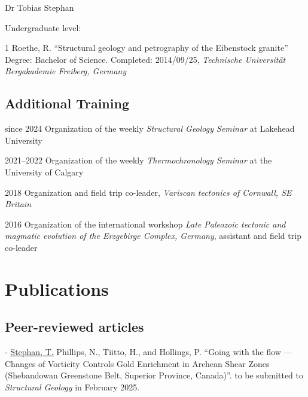 \documentclass[10pt, paper=letter]{scrartcl} %
\begin{document}
\begin{cv}{\textsf{Dr Tobias Stephan}}
\begin{cvlist}{Undergraduate level:}
        \item[1] Roethe, R. \enquote{Structural geology and petrography of the Eibenstock granite}\\
        Degree: Bachelor of Science. Completed: 2014/09/25, \textit{Technische Universität Bergakademie Freiberg, Germany}
    \end{cvlist}

    \subsection{Additional Training}
    \begin{cvlist}{}
        \item[since 2024] Organization of the weekly \textit{Structural Geology Seminar} at
        Lakehead University
        \item[2021--2022] Organization of the weekly \textit{Thermochronology Seminar} at the University of Calgary
        \item[2018] Organization and field trip co-leader, \textit{Variscan tectonics of Cornwall, SE Britain}
        \item[2016] Organization of the international workshop \textit{Late Paleozoic tectonic and magmatic evolution of the Erzgebirge Complex, Germany}, assistant and field trip co-leader
    \end{cvlist}

    \section{Publications}
    \subsection{Peer-reviewed articles}
    \setul{1pt}{.4pt}%
    \begin{cvlist}{}
        \item[-] \ul{Stephan, T.}  Phillips, N., Tiitto, H., and Hollings, P. \enquote{Going with the flow --- Changes of  Vorticity Controls Gold Enrichment in Archean Shear Zones (Shebandowan Greenstone Belt, Superior Province, Canada)}. to be submitted to \textit{Structural Geology} in February 2025.
        

\end{cvlist}
\end{cv}
\end{document}
